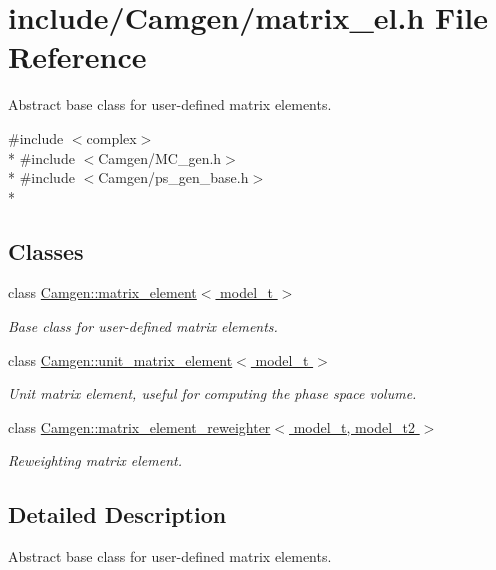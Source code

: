\hypertarget{a00689}{}\section{include/\+Camgen/matrix\+\_\+el.h File Reference}
\label{a00689}


Abstract base class for user-\/defined matrix elements.  


{\ttfamily \#include $<$complex$>$}\\*
{\ttfamily \#include $<$Camgen/\+M\+C\+\_\+gen.\+h$>$}\\*
{\ttfamily \#include $<$Camgen/ps\+\_\+gen\+\_\+base.\+h$>$}\\*
\subsection*{Classes}
\begin{DoxyCompactItemize}
\item 
class \hyperlink{a00363}{Camgen\+::matrix\+\_\+element$<$ model\+\_\+t $>$}
\begin{DoxyCompactList}\small\item\em Base class for user-\/defined matrix elements. \end{DoxyCompactList}\item 
class \hyperlink{a00571}{Camgen\+::unit\+\_\+matrix\+\_\+element$<$ model\+\_\+t $>$}
\begin{DoxyCompactList}\small\item\em Unit matrix element, useful for computing the phase space volume. \end{DoxyCompactList}\item 
class \hyperlink{a00364}{Camgen\+::matrix\+\_\+element\+\_\+reweighter$<$ model\+\_\+t, model\+\_\+t2 $>$}
\begin{DoxyCompactList}\small\item\em Reweighting matrix element. \end{DoxyCompactList}\end{DoxyCompactItemize}


\subsection{Detailed Description}
Abstract base class for user-\/defined matrix elements. 

